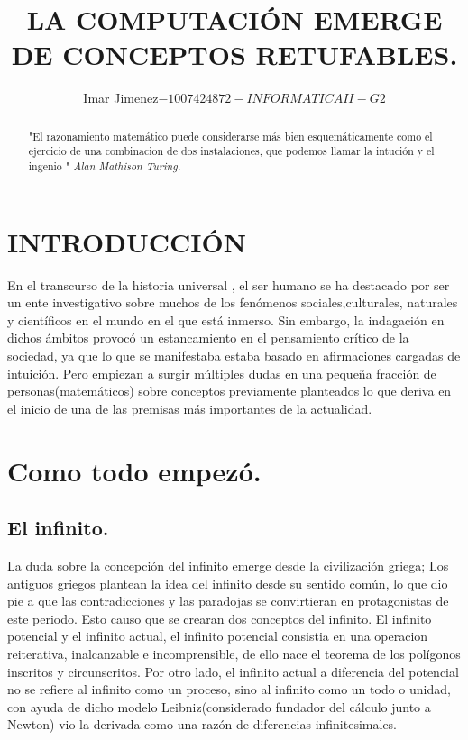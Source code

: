 \documentclass[letterpaper, 12 pt, conference]{ieeeconf}  %
\title{\LARGE \bf
LA COMPUTACIÓN EMERGE DE CONCEPTOS RETUFABLES. 
}
\author{Imar Jimenez${-1007424872 -INFORMATICA II - G2 }$%

       }%
\begin{document}
\maketitle
\thispagestyle{empty}
\pagestyle{empty}


\begin{abstract}
    
"El razonamiento matemático puede considerarse más bien esquemáticamente como el ejercicio de una combinacion de dos instalaciones, que podemos llamar la intución y el ingenio " \textit{Alan Mathison Turing.}


\end{abstract}


\section{INTRODUCCIÓN}

En el transcurso de la historia universal , el ser humano se ha destacado por ser un ente investigativo sobre muchos de los fenómenos  sociales,culturales, naturales y científicos en el mundo en el que está inmerso. Sin embargo, la indagación en dichos ámbitos provocó un estancamiento en el pensamiento crítico de la sociedad, ya que lo que se manifestaba estaba basado en afirmaciones cargadas de intuición. Pero empiezan a surgir múltiples dudas en una pequeña fracción de personas(matemáticos) sobre conceptos previamente planteados lo que deriva en el inicio de una de las premisas más importantes de la actualidad.

\section{Como todo empezó.}

\subsection{El infinito.}

La duda sobre la concepción del infinito emerge desde la civilización griega; Los antiguos griegos  plantean la idea del infinito desde su sentido común, lo que dio pie a que las contradicciones y las paradojas se convirtieran en protagonistas de este periodo. Esto causo que se crearan dos conceptos del infinito. El infinito potencial y el infinito actual, el infinito potencial consistia en una operacion reiterativa, inalcanzable e incomprensible, de ello nace el teorema de los polígonos inscritos y circunscritos. Por otro lado, el infinito actual a diferencia del potencial no se  refiere al infinito como un proceso, sino  al infinito como un todo o unidad, con ayuda de dicho modelo Leibniz(considerado fundador del cálculo junto a Newton) vio la derivada como una razón de diferencias infinitesimales.
\end{document}
